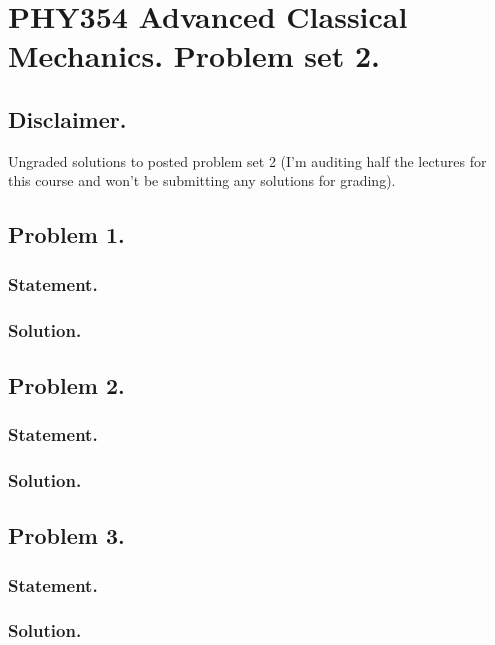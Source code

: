 
%

\chapter{PHY354 Advanced Classical Mechanics.  Problem set 2.}
\label{chap:classicalMechanicsPs2}
{}
\date{Feb 13, 2012}

\beginArtWithToc

\section{Disclaimer.}

Ungraded solutions to posted problem set 2 (I'm auditing half the lectures for this course and won't be submitting any solutions for grading).

\section{Problem 1.}
\subsection{Statement.}
\subsection{Solution.}
\section{Problem 2.}
\subsection{Statement.}
\subsection{Solution.}
\section{Problem 3.}
\subsection{Statement.}
\subsection{Solution.}
